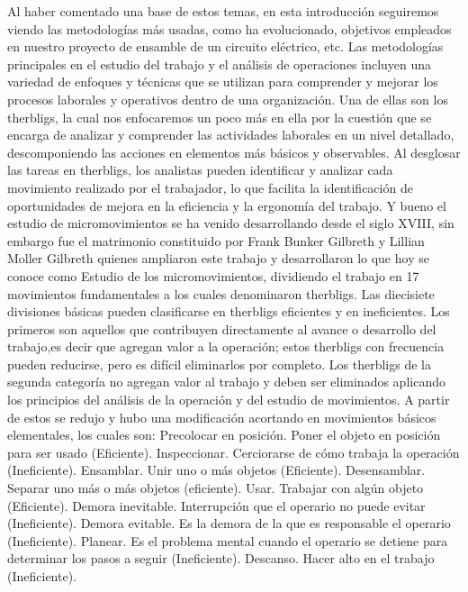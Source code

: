 \begin{itemize}
    Al haber comentado una base de estos temas, en esta introducción seguiremos viendo las metodologías más usadas, como ha evolucionado, objetivos empleados en nuestro proyecto de ensamble de un circuito eléctrico, etc.
    Las metodologías principales en el estudio del trabajo y el análisis de operaciones incluyen una variedad de enfoques y técnicas que se utilizan para comprender y mejorar los procesos laborales y operativos dentro de una organización.
    Una de ellas son los therbligs, la cual nos enfocaremos un poco más en ella por la cuestión que se encarga de analizar y comprender las actividades laborales en un nivel detallado, descomponiendo las acciones en elementos más básicos y observables. Al desglosar las tareas en therbligs, los analistas pueden identificar y analizar cada movimiento realizado por el trabajador, lo que facilita la identificación de oportunidades de mejora en la eficiencia y la ergonomía del trabajo.
    Y bueno el  estudio de micromovimientos se ha venido desarrollando desde el siglo XVIII, sin embargo fue el matrimonio constituido por Frank Bunker Gilbreth y Lillian Moller Gilbreth quienes ampliaron este trabajo y desarrollaron lo que hoy se conoce como Estudio de los micromovimientos, dividiendo el trabajo en 17 movimientos fundamentales a los cuales denominaron therbligs.
    Las diecisiete divisiones básicas pueden clasificarse en therbligs eficientes y en ineficientes. Los primeros son aquellos que contribuyen directamente al avance o desarrollo del trabajo,es decir que agregan valor a la operación; estos therbligs con frecuencia pueden reducirse, pero es difícil eliminarlos por completo.
    Los therbligs de la segunda categoría no agregan valor al trabajo y deben ser eliminados aplicando los principios del análisis de la operación y del estudio de movimientos.
    A partir de estos se redujo y hubo una modificación acortando en movimientos básicos elementales, los cuales son:
    Precolocar en posición. Poner el objeto en posición para ser usado (Eficiente).
    Inspeccionar. Cerciorarse de cómo trabaja la operación (Ineficiente).
    Ensamblar. Unir uno o más objetos (Eficiente).
    Desensamblar. Separar uno más o más objetos (eficiente).
    Usar. Trabajar con algún objeto (Eficiente).
    Demora inevitable. Interrupción que el operario no puede evitar (Ineficiente).
    Demora evitable. Es la demora de la que es responsable el operario (Ineficiente).
    Planear. Es el problema mental cuando el operario se detiene para determinar los pasos a seguir (Ineficiente).
    Descanso. Hacer alto en el trabajo (Ineficiente).

\end{itemize}

